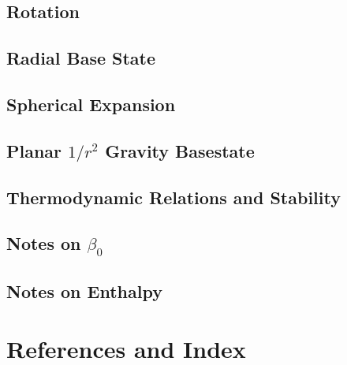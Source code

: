\documentclass[11pt]{book}    %
\makeatletter
\renewcommand*\cleardoublepage{\clearpage\if@twoside
\ifodd\c@page\else
\hbox{}
\thispagestyle{empty}
\newpage
\if@twocolumn\hbox{}\newpage\fi\fi\fi}
\makeatother
\begin{document}
\chapter{Rotation}


\chapter{Radial Base State}


\chapter{Spherical Expansion}


\chapter{Planar $1/r^2$ Gravity Basestate}


\chapter{Thermodynamic Relations and Stability}


\chapter{Notes on $\beta_0$}


\chapter{Notes on Enthalpy}


\backmatter

\part{References and Index}

\renewcommand\bibname{References}



\cleardoublepage
{}
{}
\printindex
\end{document}
